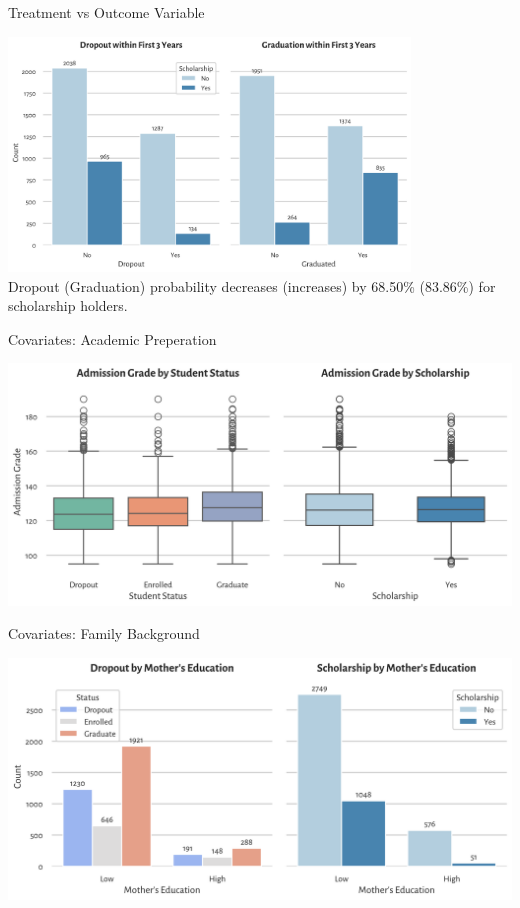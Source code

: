 \documentclass[aspectratio=169]{beamer}
\begin{document}
\begin{frame}{Treatment vs Outcome Variable}
	\begin{center}
     \includegraphics[width=0.8\textwidth]{Tex_Pictures/Graph2.png} \\
     \small
     Dropout (Graduation) probability decreases (increases) by 68.50\% (83.86\%) for scholarship holders.
     \end{center}
\end{frame}

\begin{frame}{Covariates: Academic Preperation}
	\begin{center}
     \includegraphics[width=1\textwidth]{Tex_Pictures/Graph_admission_grade.png} \\
     \end{center}
\end{frame}

\begin{frame}{Covariates: Family Background}
	\begin{center}
     \includegraphics[width=1\textwidth]{Tex_Pictures/Graph_mother_educ}
     \end{center}
\end{frame}
\end{document}

